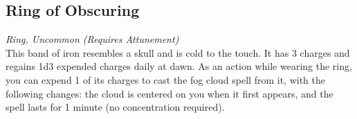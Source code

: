 \documentclass[letterpaper,openany,oneside,twocolumn]{book}
\begin{document}
\subsection*{Ring of Obscuring}
\textit{Ring, Uncommon (Requires Attunement)}\\
{\entryfont This band of iron resembles a skull and is cold to the touch. It has 3 charges and regains 1d3 expended charges daily at dawn. As an action while wearing the ring, you can expend 1 of its charges to cast the fog cloud spell from it, with the following changes: the cloud is centered on you when it first appears, and the spell lasts for 1 minute (no concentration required).}
\end{document}
